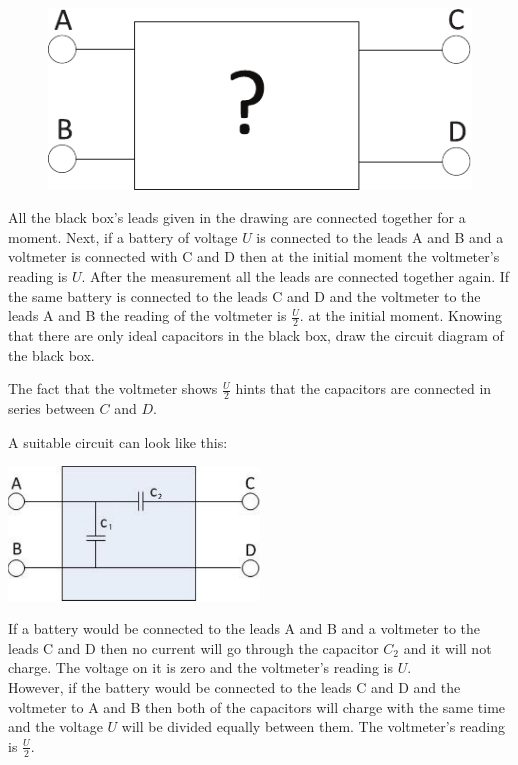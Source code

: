 \begin{figure}%
\includegraphics[width=\linewidth]{2013-v3g-04-pilt1}%
\end{figure}
All the black box’s leads given in the drawing are connected together for a moment. Next, if a battery of voltage $U$ is connected to the leads A and B and a voltmeter is connected with C and D then at the initial moment the voltmeter’s reading is $U$. After the measurement all the leads are connected together again. If the same battery is connected to the leads C and D and the voltmeter to the leads A and B the reading of the voltmeter is $\frac{U}{2}.$ at the initial moment. Knowing that there are only ideal capacitors in the black box, draw the circuit diagram of the black box.

\hinteng
The fact that the voltmeter shows $\frac{U}{2}$ hints that the capacitors are connected in series between $C$ and $D$.

\solueng
A suitable circuit can look like this:
\begin{center}
\includegraphics[width=0.5\textwidth]{2013-v3g-04-mustkastlah}\\
\end{center}
If a battery would be connected to the leads A and B and a voltmeter to the leads C and D then no current will go through the capacitor $C_2$ and it will not charge. The voltage on it is zero and the voltmeter’s reading is $U$.\\
However, if the battery would be connected to the leads C and D and the voltmeter to A and B then both of the capacitors will charge with the same time and the voltage $U$ will be divided equally between them. The voltmeter’s reading is $\frac{U}{2}$.
\probend